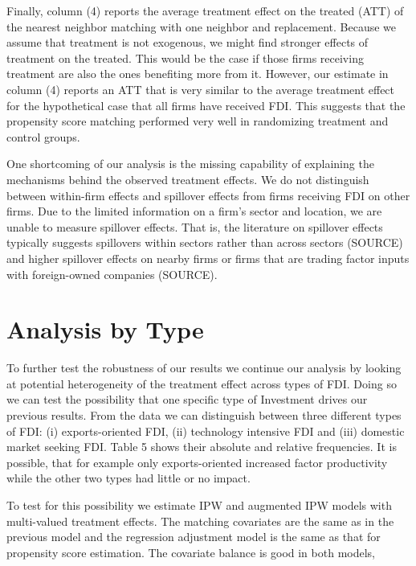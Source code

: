 \documentclass[a4paper,11pt]{scrartcl}
\begin{document}
Finally, column (4) reports the average treatment effect on the treated (ATT) of the nearest neighbor matching with one neighbor and replacement. Because we assume that treatment is not exogenous, we might find stronger effects of treatment on the treated. This would be the case if those firms receiving treatment are also the ones benefiting more from it. However, our estimate in column (4) reports an ATT that is very similar to the average treatment effect for the hypothetical case that all firms have received FDI. This suggests that the propensity score matching performed very well in randomizing treatment and control groups. 

One shortcoming of our analysis is the missing capability of explaining the mechanisms behind the observed treatment effects. We do not distinguish between within-firm effects and spillover effects from firms receiving FDI on other firms. Due to the limited information on a firm's sector and location, we are unable to measure spillover effects. That is, the literature on spillover effects typically suggests spillovers within sectors rather than across sectors (SOURCE) and higher spillover effects on nearby firms or firms that are trading factor inputs with foreign-owned companies (SOURCE). 




\section{Analysis by Type}


To further test the robustness of our results  we continue our analysis by looking at potential heterogeneity of the treatment effect across types of FDI. Doing so we can test the possibility that one specific type of Investment drives our previous results. From the data we can distinguish between three different types of FDI: (i) exports-oriented FDI, (ii) technology intensive FDI and (iii) domestic market seeking FDI. Table 5 shows their absolute and relative frequencies. It is possible, that for example only exports-oriented increased factor productivity while the other two types had little or no impact.





To test for this possibility we estimate IPW and augmented IPW models with multi-valued treatment effects. The matching covariates are the same as in the previous model and the regression adjustment model is the same as that for propensity score estimation. The covariate balance is good in both models, 
\end{document}
